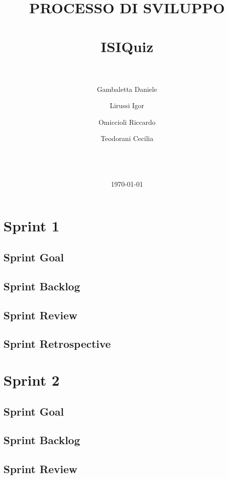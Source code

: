 \documentclass{report}
\title{\LARGE
    PROCESSO DI SVILUPPO \\
    \hrulefill \\
    \textbf{ISIQuiz} \\ 
    \hrulefill \\
}
\author{
    Gambaletta Daniele \\ \emailaddr{daniele.gambaletta@studio.unibo.it}
    \and
    Lirussi Igor \\ \emailaddr{igor.lirussi@studio.unibo.it}
    \and 
    Omiccioli Riccardo \\ \emailaddr{riccardo.omiccioli@studio.unibo.it} 
    \and 
    Teodorani Cecilia \\ \emailaddr{cecilia.teodorani@studio.unibo.it} 
    \\ \\ \\ 
}
\date{\today}
\begin{document}
\renewcommand{\labelenumii}{\arabic{enumi}.\arabic{enumii}}
\renewcommand{\labelenumiii}{\arabic{enumi}.\arabic{enumii}.\arabic{enumiii}}
\renewcommand{\labelenumiv}{\arabic{enumi}.\arabic{enumii}.\arabic{enumiii}.\arabic{enumiv}}

\maketitle
\tableofcontents

    
    
    \chapter{Sprint 1}
    \section{Sprint Goal}
        
    \section{Sprint Backlog}
        
    \section{Sprint Review}
        
    \section{Sprint Retrospective}
        
    
    \chapter{Sprint 2}
    \section{Sprint Goal}
        
    \section{Sprint Backlog}
        
    \section{Sprint Review}
        
\end{document}
